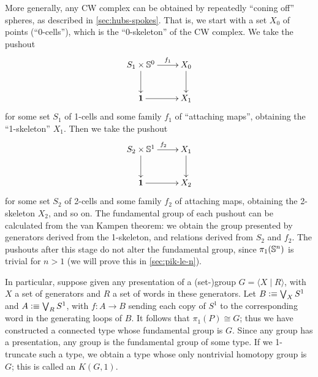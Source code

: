 \begin{eg}
  More generally, any CW complex can be obtained by repeatedly ``coning off'' spheres, as described in \autoref{sec:hubs-spokes}.
  That is, we start with a set $X_0$ of points (``0-cells''), which is the ``0-skeleton'' of the CW complex.
  We take the pushout
  \begin{equation*}
    \vcenter{\xymatrix{
        S_1 \times \Sn^0\ar[r]^-{f_1}\ar[d] &
        X_0\ar[d]\\
        \unit \ar[r] &
        X_1
      }}
  \end{equation*}
  for some set $S_1$ of 1-cells and some family $f_1$ of ``attaching maps'', obtaining the ``1-skeleton'' $X_1$.
  Then we take the pushout
  \begin{equation*}
    \vcenter{\xymatrix{
        S_2 \times \Sn^1\ar[r]^{f_2}\ar[d] &
        X_1\ar[d]\\
        \unit \ar[r] &
        X_2
      }}
  \end{equation*}
  for some set $S_2$ of 2-cells and some family $f_2$ of attaching maps, obtaining the 2-skeleton $X_2$, and so on.
  The fundamental group of each pushout can be calculated from the van Kampen theorem: we obtain the group presented by generators derived from the 1-skeleton, and relations derived from $S_2$ and $f_2$.
  The pushouts after this stage do not alter the fundamental group, since $\pi_1(\mathbb{S}^n)$ is trivial for $n>1$ (we will prove this in \autoref{sec:pik-le-n}).
\end{eg}

\begin{eg}\label{eg:kg1}
  In particular, suppose given any presentation of a (set-)group $G = \langle X \mid R \rangle$, with $X$ a set of generators and $R$ a set of words in these generators.
  Let $B\vcentcolon\equiv \bigvee_X S^1$ and $A\vcentcolon\equiv \bigvee_R S^1$, with $f:A\to B$ sending each copy of $S^1$ to the corresponding word in the generating loops of $B$.
  It follows that $\pi_1(P) \cong G$; thus we have constructed a connected type whose fundamental group is $G$.
  Since any group has a presentation, any group is the fundamental group of some type.
  If we 1-truncate such a type, we obtain a type whose only nontrivial homotopy group is $G$; this is called an  $K(G,1)$.%
\end{eg}

%

